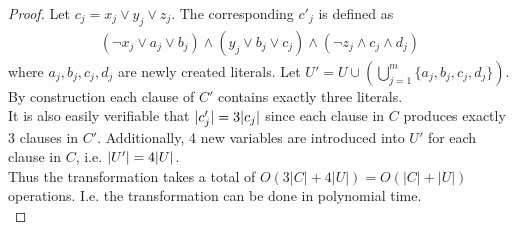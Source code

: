 \documentclass[12pt]{article}
\newenvironment{question}[2][Question]{\begin{trivlist}
\item[\hskip \labelsep {\bfseries #1}\hskip \labelsep {\bfseries #2.}]}{\end{trivlist}}
\DeclarePairedDelimiter\abs{\lvert}{\rvert}%
\begin{document}
\begin{question}{1}
\begin{proof}
    Let $c_{j} = x_{j} \vee y_{j} \vee z_{j}$. The corresponding $c'_{j}$ is
    defined as
    \begin{align*}
      (\neg x_{j} \vee a_{j} \vee b_{j}) \land (y_{j} \vee b_{j} \vee c_{j}) \land (\neg z_{j} \land c_{j} \land d_{j})
    \end{align*}
    where $a_{j}, b_{j}, c_{j}, d_{j}$ are newly created literals.
    Let $U' = U \cup (\bigcup_{j=1}^{m} \{a_{j}, b_{j}, c_{j}, d_{j}\})$. \\

    By construction each clause of $C'$ contains exactly three literals. \\

    It is also easily verifiable that $\abs{c'_{j}} = 3\abs{c_{j}}$ since each
    clause in $C$ produces exactly 3 clauses in $C'$.  Additionally, 4 new variables
    are introduced into $U'$ for each clause in $C$, i.e. $\abs{U'} = 4\abs{U}$. \\

    Thus the transformation takes a total of $O(3|C| + 4|U|) = O(|C| + |U|)$ operations.
    I.e. the transformation can be done in polynomial time. \\


\end{proof}
\end{question}
\end{document}
